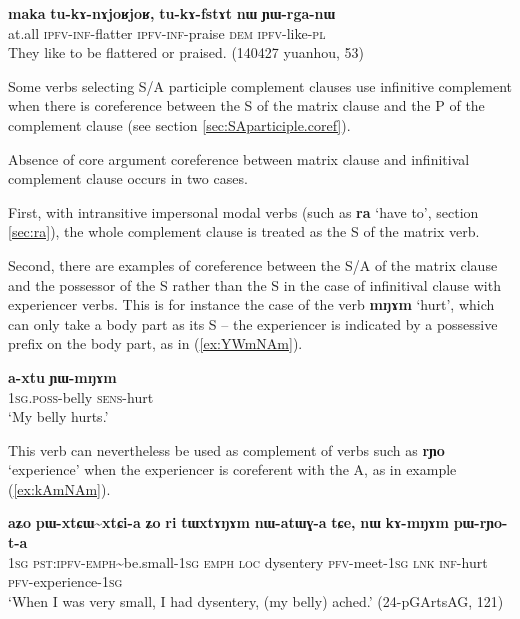 \documentclass[oldfontcommands,oneside,a4paper,11pt]{article}
\newcommand{\ipa}[1]{\textbf{\phon#1}} %
\newcommand{\jpg}[2]{\ipa{#1} `#2'} %
\newcommand{\tld}{\textasciitilde{}}
\begin{document}
  \begin{exe}
   \ex   \label{ex:YWrganW} 
\gll
\ipa{maka}  	\ipa{tu-kɤ-nɤjoʁjoʁ,}  	\ipa{tu-kɤ-fstɤt}  	\ipa{nɯ}  	\ipa{ɲɯ-rga-nɯ}  \\
at.all \textsc{ipfv-inf}-flatter \textsc{ipfv-inf}-praise \textsc{dem} \textsc{ipfv}-like-\textsc{pl} \\
\glt They like to be flattered or praised. (140427 yuanhou, 53)
    \end{exe}  

Some verbs selecting S/A participle complement clauses use infinitive complement when there is coreference between the S of the matrix clause and the P of the complement clause (see section \ref{sec:SAparticiple.coref}).

Absence of core argument coreference between matrix clause and infinitival complement clause occurs in two cases. 

First, with intransitive impersonal modal verbs (such as \jpg{ra}{have to}, section \ref{sec:ra}), the whole complement clause is treated as the S of the matrix verb. 

Second, there are examples of coreference between the S/A of the matrix clause and the possessor of the S rather than the S in the case of infinitival clause with experiencer verbs. This is for instance the case of the verb \ipa{mŋɤm} `hurt', which can only take a body part as its S -- the experiencer is indicated by a possessive prefix on the body part, as in (\ref{ex:YWmNAm}).
 
 \begin{exe}
\ex \label{ex:YWmNAm}
\gll \ipa{a-xtu} 	\ipa{ɲɯ-mŋɤm} \\
\textsc{1sg.poss}-belly \textsc{sens}-hurt \\
\glt `My belly hurts.' 
\end{exe}
 
This verb can nevertheless be  used as complement of verbs such as \jpg{rɲo}{experience} when the experiencer is coreferent with the A, as in example (\ref{ex:kAmNAm}).
 
 \begin{exe}
\ex \label{ex:kAmNAm}
\gll \ipa{aʑo} 	\ipa{pɯ-xtɕɯ\tld{}xtɕi-a} 	\ipa{ʑo} 	\ipa{ri} 	\ipa{tɯxtɤŋɤm} 	\ipa{nɯ-atɯɣ-a} 	\ipa{tɕe,} 	\ipa{nɯ} 	\ipa{kɤ-mŋɤm} 	\ipa{pɯ-rɲo-t-a} \\
\textsc{1sg} \textsc{pst:ipfv-emph}\tld{}be.small-\textsc{1sg} \textsc{emph} \textsc{loc} dysentery \textsc{pfv}-meet-\textsc{1sg} \textsc{lnk} \textsc{inf}-hurt \textsc{pfv}-experience-\textsc{1sg} \\
\glt `When I was very small, I had dysentery, (my belly) ached.'  (24-pGArtsAG, 121)
\end{exe}
\end{document}
